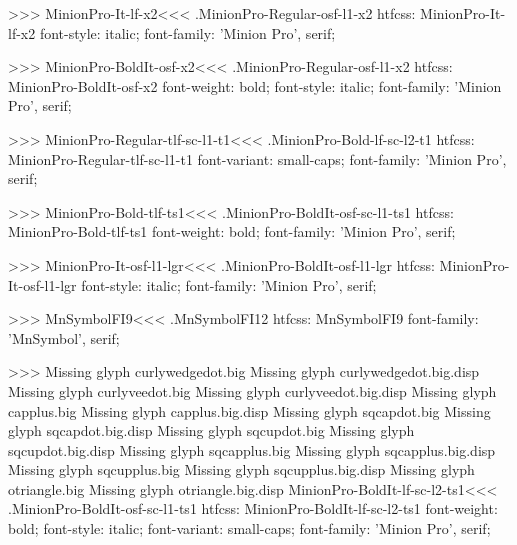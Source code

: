 {>>>
\<MinionPro-It-lf-x2\><<<
.MinionPro-Regular-osf-l1-x2
htfcss:  MinionPro-It-lf-x2  font-style: italic; font-family: 'Minion Pro', serif;

>>>
\<MinionPro-BoldIt-osf-x2\><<<
.MinionPro-Regular-osf-l1-x2
htfcss:  MinionPro-BoldIt-osf-x2  font-weight: bold; font-style: italic; font-family: 'Minion Pro', serif;

>>>
\<MinionPro-Regular-tlf-sc-l1-t1\><<<
.MinionPro-Bold-lf-sc-l2-t1
htfcss:  MinionPro-Regular-tlf-sc-l1-t1  font-variant: small-caps; font-family: 'Minion Pro', serif;

>>>
\<MinionPro-Bold-tlf-ts1\><<<
.MinionPro-BoldIt-osf-sc-l1-ts1
htfcss:  MinionPro-Bold-tlf-ts1  font-weight: bold; font-family: 'Minion Pro', serif;

>>>
\<MinionPro-It-osf-l1-lgr\><<<
.MinionPro-BoldIt-osf-l1-lgr
htfcss:  MinionPro-It-osf-l1-lgr  font-style: italic; font-family: 'Minion Pro', serif;

>>>
\<MnSymbolFI9\><<<
.MnSymbolFI12
htfcss:  MnSymbolFI9  font-family: 'MnSymbol', serif;

>>>
Missing glyph	curlywedgedot.big
Missing glyph	curlywedgedot.big.disp
Missing glyph	curlyveedot.big
Missing glyph	curlyveedot.big.disp
Missing glyph	capplus.big
Missing glyph	capplus.big.disp
Missing glyph	sqcapdot.big
Missing glyph	sqcapdot.big.disp
Missing glyph	sqcupdot.big
Missing glyph	sqcupdot.big.disp
Missing glyph	sqcapplus.big
Missing glyph	sqcapplus.big.disp
Missing glyph	sqcupplus.big
Missing glyph	sqcupplus.big.disp
Missing glyph	otriangle.big
Missing glyph	otriangle.big.disp
\<MinionPro-BoldIt-lf-sc-l2-ts1\><<<
.MinionPro-BoldIt-osf-sc-l1-ts1
htfcss:  MinionPro-BoldIt-lf-sc-l2-ts1  font-weight: bold; font-style: italic; font-variant: small-caps; font-family: 'Minion Pro', serif;

}
